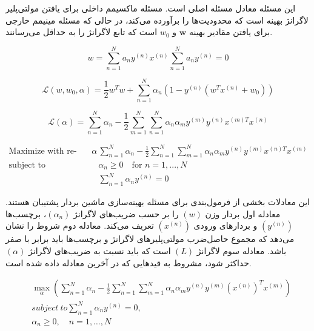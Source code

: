 \documentclass[12pt]{article}
\begin{document}
این مسئله معادل مسئله اصلی است. مسئله ماکسیمم داخلی برای یافتن مولتی‌پلیر لاگرانژ بهینه است که محدودیت‌ها را برآورده می‌کند، در حالی که مسئله مینیمم خارجی برای یافتن مقادیر بهینه $\mathbf{w}$ و $w_0$ است که تابع لاگرانژ را به حداقل می‌رسانند.

\begin{equation}
    w = \sum_{n=1}^{N} a_n y^{(n)} x^{(n)}
\sum_{n=1}^{N} a_n y^{(n)} = 0
\end{equation}

\begin{equation}
    \mathcal{L}(w, w_0, \alpha) = \frac{1}{2} w^T w + \sum_{n=1}^{N} \alpha_n (1 - y^{(n)} (w^T x^{(n)} + w_0))
\end{equation}

\begin{equation}
    \mathcal{L}(\alpha) = \sum_{n=1}^{N} \alpha_n - \frac{1}{2} \sum_{m=1}^{N} \sum_{n=1}^{N} \alpha_n \alpha_m y^{(m)} y^{(n)} x^{(m)T} x^{(n)}
\end{equation}

\begin{latin}
    \[
    \begin{aligned}
        \text{Maximize with respect to } \alpha \quad & \sum_{n=1}^{N} \alpha_n - \frac{1}{2} \sum_{n=1}^{N} \sum_{m=1}^{N} \alpha_n \alpha_m y^{(n)} y^{(m)} x^{(n)T} x^{(m)} \\
        \text{subject to} \quad & \alpha_n \geq 0 \quad \text{for } n = 1, ..., N \\
        & \sum_{n=1}^{N} \alpha_n y^{(n)} = 0
    \end{aligned}
    \]
\end{latin}



این معادلات بخشی از فرمول‌بندی برای مسئله بهینه‌سازی ماشین بردار پشتیبان  هستند. معادله اول بردار وزن $(w)$ را بر حسب ضریب‌های لاگرانژ $(\alpha_n)$، برچسب‌ها $(y^{(n)})$ و بردارهای ورودی $(x^{(n)})$ تعریف می‌کند. معادله دوم شروط را نشان می‌دهد که مجموع حاصل‌ضرب مولتی‌پلیرهای لاگرانژ و برچسب‌ها باید برابر با صفر باشد. معادله سوم لاگرانژ $(L)$ است که باید نسبت به ضریب‌های لاگرانژ $(\alpha)$ حداکثر شود، مشروط به قیدهایی که در آخرین معادله داده شده است.

\begin{equation}
    \begin{aligned}
        & \max_{\alpha} \left( \sum_{n=1}^{N} \alpha_n - \frac{1}{2} \sum_{n=1}^{N} \sum_{m=1}^{N} \alpha_n \alpha_m y^{(n)} y^{(m)} (x^{(n)})^T x^{(m)} \right) \\
        & subject\:to  \sum_{n=1}^{N} \alpha_n y^{(n)} = 0, \\
        & \alpha_n \geq 0, \quad n = 1, \ldots, N
    \end{aligned}
\end{equation}
\end{document}
